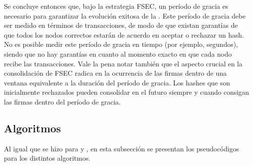 %
Se concluye entonces que, bajo la estrategia FSEC, un período de gracia es necesario para garantizar la evolución
exitosa de la \hashchain. 
%
Este período de gracia debe ser medido en términos de transacciones, de modo de que existan garantías
de que todos los nodos correctos estarán de acuerdo en aceptar o rechazar un hash.
%
No es posible medir este período de gracia en tiempo (por ejemplo, segundos), siendo que no hay garantías en
cuanto al momento exacto en que cada nodo recibe las transacciones.
%
Vale la pena notar también que el aspecto crucial en la consolidación de FSEC radica en la ocurrencia
de las \SPH firmas dentro de una ventana equivalente a la duración
del período de gracia.
%
Los hashes que son inicialmente rechazados pueden consolidar en el futuro siempre y cuando
consigan las \SPH firmas dentro del período de gracia.
%


\subsection{Algoritmos}\label{subsec:hashchain-algorithms}

Al igual que se hizo para \vanilla y \compresschain, en esta subsección se presentan los pseudocódigos
para los distintos algoritmos. 

